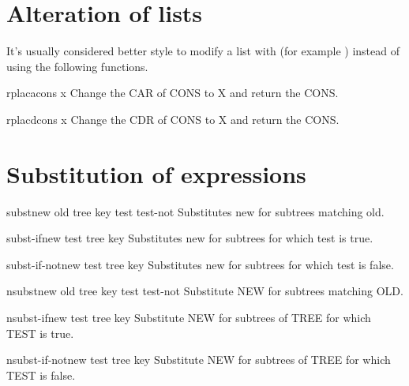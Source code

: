 \documentclass[10pt,english]{book}
\begin{document}
\section{Alteration of lists}
\label{sec:alteration-lists}

It's usually considered better style to modify a list with
 (for example ) instead of
using the following functions.

\begin{function}{rplaca}{cons x}
  Change the CAR of CONS to X and return the CONS.
\end{function}

\begin{function}{rplacd}{cons x}
  Change the CDR of CONS to X and return the CONS.
\end{function}

\section{Substitution of expressions}
\label{sec:subst-expr}

\begin{function}{subst}{new old tree \key key test test-not}
  Substitutes new for subtrees matching old.
\end{function}

\begin{function}{subst-if}{new test tree \key key}
  Substitutes new for subtrees for which test is true.
\end{function}

\begin{function}{subst-if-not}{new test tree \key key}
  Substitutes new for subtrees for which test is false.
\end{function}

\begin{function}{nsubst}{new old tree \key key test test-not}
  Substitute NEW for subtrees matching OLD.
\end{function}

\begin{function}{nsubst-if}{new test tree \key key}
  Substitute NEW for subtrees of TREE for which TEST is true.
\end{function}

\begin{function}{nsubst-if-not}{new test tree \key key}
  Substitute NEW for subtrees of TREE for which TEST is false.
\end{function}
\end{document}
